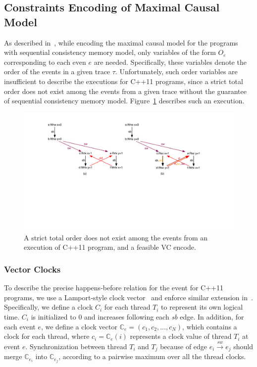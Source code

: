 \documentclass[preprint, numbers, 10pt]{sigplanconf}
\begin{document}
\subsection{Constraints Encoding of Maximal Causal Model}
\label{sec:encode}

As described in~\cite{Huang:2015}, while encoding the maximal causal model 
for the programs with sequential consistency memory model, only variables of 
the form $O_e$ corresponding to each even $e$ are needed. Specifically,
these variables denote the order of the events in a given trace $\tau$. 
Unfortunately, such order variables are insufficient to describe the executions
for C++11 programs, since a strict total order does not exist among 
the events from a given trace without the guarantee of sequential consistency 
memory model. Figure~\ref{fig:noStrictOrder} describes such an execution. 

\begin{figure}%
\centering\includegraphics[scale=0.5]{noStrictOrder.pdf} %
\caption{A strict total order does not exist among the events from an 
execution of C++11 program, and a feasible VC encode.}
\label{fig:noStrictOrder}
\end{figure}

\subsubsection{Vector Clocks}

To describe the precise happens-before relation for the
event for C++11 programs, we use a Lamport-style 
clock vector~\cite{Lamport:1978} and enforce similar extension 
in~\cite{Lidbury:2017,Norris:2013}. Specifically, 
we define a clock $C_i$ for each thread $T_i$ to represent
its own logical time. $C_i$ is initialized to 0 and increases following 
each \textit{sb} edge. In addition, for each event $e$, 
we define a clock vector $\mathbb{C}_e=(c_1, c_2, ..., c_N)$, 
which contains a clock for each thread, where $c_i=\mathbb{C}_e(i)$ 
represents a clock value of thread $T_i$ at event $e$. Synchronization between thread $T_i$
and $T_j$ because of edge $e_i \stackrel{sw}{\longrightarrow} e_j$ should 
merge $\mathbb{C}_{e_i}$ into $\mathbb{C}_{e_j}$, according to a pairwise maximum 
over all the thread clocks. 
\end{document}
